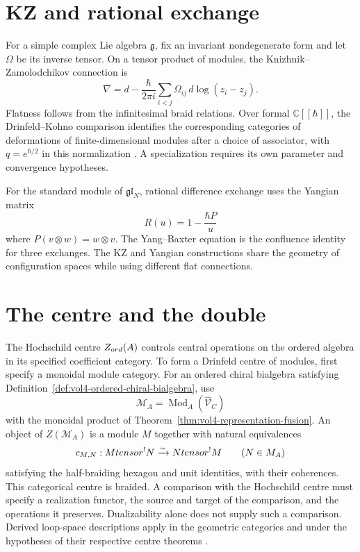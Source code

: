 \section{KZ and rational exchange}
For a simple complex Lie algebra $\mathfrak g$, fix an invariant
nondegenerate form and let $\Omega$ be its inverse tensor. On a tensor
product of modules, the Knizhnik--Zamolodchikov connection is
\[
 \nabla=d-\frac{\hbar}{2\pi i}
 \sum_{i<j}\Omega_{ij}\,d\log(z_i-z_j).
\]
Flatness follows from the infinitesimal braid relations. Over formal
$\mathbb C[[\hbar]]$, the Drinfeld--Kohno comparison identifies the
corresponding categories of deformations of finite-dimensional modules
after a choice of associator, with $q=e^{\hbar/2}$ in this normalization
\cite[Section~8.27.7]{EGNOTensor}. A specialization requires its own
parameter and convergence hypotheses.

For the standard module of $\mathfrak{gl}_N$, rational difference exchange uses the Yangian matrix
\[
 R(u)=1-\frac{\hbar P}{u}
\]
where $P(v\otimes w)=w\otimes v$. The Yang--Baxter equation is the confluence identity for three exchanges. The KZ and Yangian constructions share the geometry of configuration spaces while using different flat connections.

\section{The centre and the double}
The Hochschild centre $Z_{ord}(A)$ controls central operations on the
ordered algebra in its specified coefficient category.
To form a Drinfeld centre of modules, first specify a monoidal module category.
For an ordered chiral bialgebra satisfying
Definition~\ref{def:vol4-ordered-chiral-bialgebra}, use
\[
 \mathcal M_A=\operatorname{Mod}_A(\widehat{\mathcal V}_C)
\]
with the monoidal product of Theorem~\ref{thm:vol4-representation-fusion}.
An object of $Z(\mathcal M_A)$ is a module $M$ together with natural equivalences
\[
 c_{M,N}:Mtensor^{!}N
 \xrightarrow{\sim}Ntensor^{!}M
 \qquad(N\in M_A)
\]
satisfying the half-braiding hexagon and unit identities, with their coherences.
This categorical centre is braided.
A comparison with the Hochschild centre must specify a realization functor,
the source and target of the comparison, and the operations it preserves.
Dualizability alone does not supply such a comparison.
Derived loop-space descriptions apply in the geometric categories and
under the hypotheses of their respective centre theorems
\cite{BenZviFrancisNadler}.


